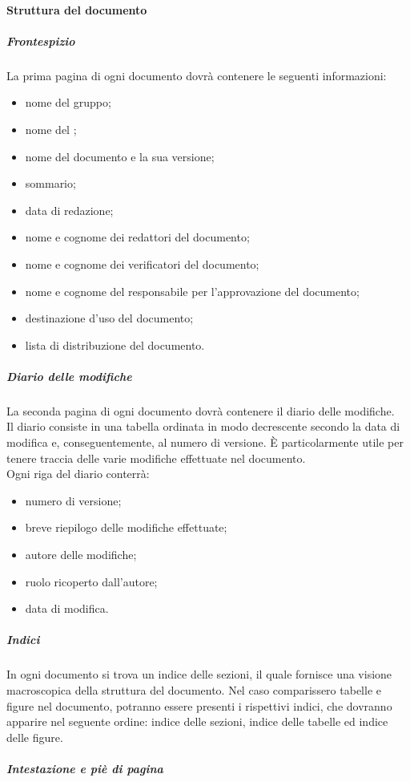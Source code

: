 	\paragraph{Struttura del documento}
		\subparagraph{Frontespizio}
		La prima pagina di ogni documento dovrà contenere le seguenti informazioni:
		\begin{itemize}
			\item nome del gruppo;
			\item nome del ;
			\item nome del documento e la sua versione;
			\item sommario;
			\item data di redazione;
			\item nome e cognome dei redattori del documento;
			\item nome e cognome dei verificatori del documento;
			\item nome e cognome del responsabile per l'approvazione del documento;
			\item destinazione d'uso del documento;
			\item lista di distribuzione del documento.
		\end{itemize}
		\subparagraph{Diario delle modifiche}
		La seconda pagina di ogni documento dovrà contenere il diario delle modifiche.\\
		Il diario consiste in una tabella ordinata in modo decrescente secondo la data di modifica e, conseguentemente, al numero di versione. È particolarmente utile per tenere traccia delle varie modifiche effettuate nel documento. \\
		Ogni riga del diario conterrà:
		\begin{itemize}
			\item numero di versione;
			\item breve riepilogo delle modifiche effettuate;
			\item autore delle modifiche;
			\item ruolo ricoperto dall'autore;
			\item data di modifica.
		\end{itemize}		
		\subparagraph{Indici}
		In ogni documento si trova un indice delle sezioni, il quale fornisce una visione macroscopica della struttura del documento. Nel caso comparissero tabelle e figure nel documento, potranno essere presenti i rispettivi indici, che dovranno apparire nel seguente ordine: indice delle sezioni, indice delle tabelle ed indice delle figure.
		\subparagraph{Intestazione e piè di pagina}
